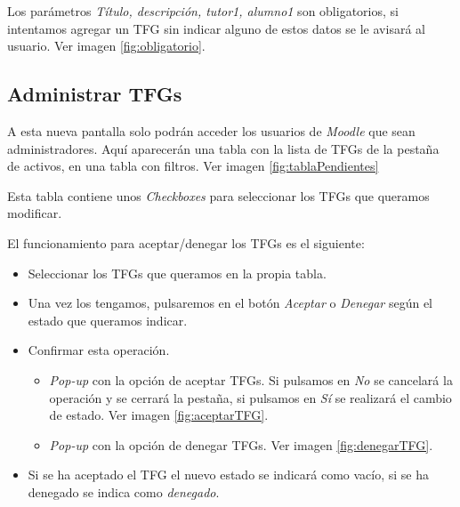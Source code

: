 
Los parámetros \emph{Título, descripción, tutor1, alumno1} son obligatorios, si intentamos agregar un TFG sin indicar alguno de estos datos se le avisará al usuario. Ver imagen \ref{fig:obligatorio}.


\subsection{Administrar TFGs}

A esta nueva pantalla solo podrán acceder los usuarios de \emph{Moodle} que sean administradores.
Aquí aparecerán una tabla con la lista de TFGs de la pestaña de activos, en una tabla con filtros. Ver imagen \ref{fig:tablaPendientes}


Esta tabla contiene unos \emph{Checkboxes} para seleccionar los TFGs que queramos modificar.

El funcionamiento para aceptar/denegar los TFGs es el siguiente:
\begin{itemize}
	\item Seleccionar los TFGs que queramos en la propia tabla.
	\item Una vez los tengamos, pulsaremos en el botón \emph{Aceptar} o \emph{Denegar} según el estado que queramos indicar.
	\item Confirmar esta operación. 
	\begin{itemize}
		\item \emph{Pop-up} con la opción de aceptar TFGs. Si pulsamos en \emph{No} se cancelará la operación y se cerrará la pestaña, si pulsamos en \emph{Sí} se realizará el cambio de estado. Ver imagen \ref{fig:aceptarTFG}.
		\item \emph{Pop-up} con la opción de denegar TFGs. Ver imagen \ref{fig:denegarTFG}.
	\end{itemize}
	\item Si se ha aceptado el TFG el nuevo estado se indicará como vacío, si se ha denegado se indica como \emph{denegado}.
\end{itemize}


